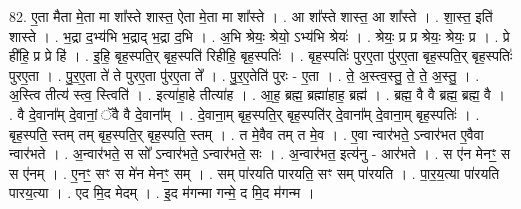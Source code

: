 \documentclass[17pt]{extarticle}
\begin{document}
82. ए॒ता मैता मे॒ता मा शा᳚स्ते शास्त॒ ऐता मे॒ता मा शा᳚स्ते । . आ शा᳚स्ते शास्त॒ आ शा᳚स्ते । . शा॒स्त॒ इति॑ शास्ते । . भ॒द्रा द॒भ्य॑भि भ॒द्राद् भ॒द्रा द॒भि । . अ॒भि श्रेयः॒ श्रेयो॒ ऽभ्य॑भि श्रेयः॑ । . श्रेयः॒ प्र प्र श्रेयः॒ श्रेयः॒ प्र । . प्रे ही॑हि॒ प्र प्रे हि॑ । . इ॒हि॒ बृह॒स्पति॒र् बृह॒स्पति॑ रिहीहि॒ बृह॒स्पतिः॑ । . बृह॒स्पतिः॑ पुरए॒ता पु॑रए॒ता बृह॒स्पति॒र् बृह॒स्पतिः॑ पुरए॒ता । . पु॒र॒ए॒ता ते॑ ते पुरए॒ता पु॑रए॒ता ते᳚ । . पु॒र॒ए॒तेति॑ पुरः - ए॒ता । . ते॒ अ॒स्त्व॒स्तु॒ ते॒ ते॒ अ॒स्तु॒ । . अ॒स्त्वि तीत्य॑ स्त्व॒ स्त्विति॑ । . इत्या॑हा॒हे तीत्या॑ह । . आ॒ह॒ ब्रह्म॒ ब्रह्मा॑हाह॒ ब्रह्म॑ । . ब्रह्म॒ वै वै ब्रह्म॒ ब्रह्म॒ वै । . वै दे॒वाना᳚म् दे॒वानां॒ ॅवै वै दे॒वाना᳚म् । . दे॒वाना॒म् बृह॒स्पति॒र् बृह॒स्पति॑र् दे॒वाना᳚म् दे॒वाना॒म् बृह॒स्पतिः॑ । . बृह॒स्पति॒ स्तम् तम् बृह॒स्पति॒र् बृह॒स्पति॒ स्तम् । . त मे॒वैव तम् त मे॒व । . ए॒वा न्वार॑भते॒ ऽन्वार॑भत ए॒वैवा न्वार॑भते । . अ॒न्वार॑भते॒ स सो᳚ ऽन्वार॑भते॒ ऽन्वार॑भते॒ सः । . अ॒न्वार॑भत॒ इत्य॑नु - आर॑भते । . स ए॑न मेनꣳ॒॒ स स ए॑नम् । . ए॒नꣳ॒॒ सꣳ स मे॑न मेनꣳ॒॒ सम् । . सम् पा॑रयति पारयति॒ सꣳ सम् पा॑रयति । . पा॒र॒य॒त्या पा॑रयति पारय॒त्या । . एद मि॒द मेदम् । . इ॒द म॑गन्मा गन्मे॒ द मि॒द म॑गन्म । \newline
\end{document}
